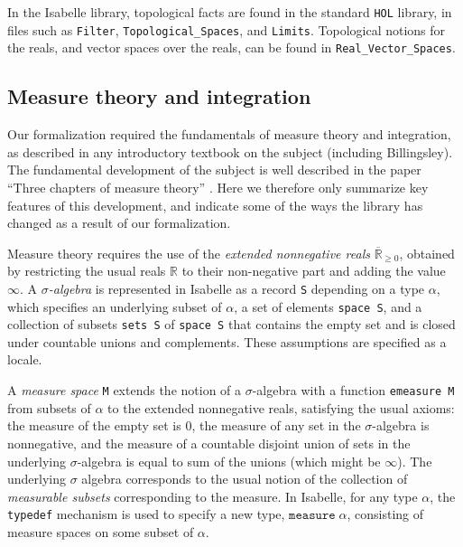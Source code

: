 \documentclass{svjour3}
\newcommand{\RR}{\mathbb{R}}
\newcommand{\ennRR}{\overline{\mathbb{R}}_{\ge 0}}
\begin{document}
In the Isabelle library, topological facts are found in the standard \texttt{HOL} library, in files such as \texttt{Filter}, \texttt{Topological\_Spaces}, and \texttt{Limits}. Topological notions for the reals, and vector spaces over the reals, can be found in \texttt{Real\_Vector\_Spaces}.


\subsection{Measure theory and integration}
\label{subsection:measure:theory}

Our formalization required the fundamentals of measure theory and integration, as described in any introductory textbook on the subject (including Billingsley). The fundamental development of the subject is well described in the paper ``Three chapters of measure theory'' \cite{hoelzl:heller:11}. Here we therefore only summarize key features of this development, and indicate some of the ways the library has changed as a result of our formalization.

Measure theory requires the use of the \emph{extended nonnegative reals} $\ennRR$, obtained by restricting the usual reals $\RR$ to their non-negative part and adding the value $\infty$. A \emph{$\sigma$-algebra} is represented in Isabelle as a record \texttt{S} depending on a type $\alpha$, which specifies an underlying subset of $\alpha$, a set of elements \texttt{space S}, and a collection of subsets \texttt{sets S} of \texttt{space S} that contains the empty set and is closed under countable unions and complements. These assumptions are specified as a locale. 

A \emph{measure space} \texttt{M} extends the notion of a $\sigma$-algebra with a function \texttt{emeasure M} from subsets of $\alpha$ to the extended nonnegative reals, satisfying the usual axioms: the measure of the empty set is $0$, the measure of any set in the $\sigma$-algebra is nonnegative, and the measure of a countable disjoint union of sets in the underlying $\sigma$-algebra is equal to sum of the unions (which might be $\infty$). The underlying $\sigma$ algebra corresponds to the usual notion of the collection of \emph{measurable subsets} corresponding to the measure. In Isabelle, for any type $\alpha$, the \texttt{typedef} mechanism is used to specify a new type, $\mathtt{measure} \; \alpha$, consisting of measure spaces on some subset of $\alpha$. 
\end{document}
